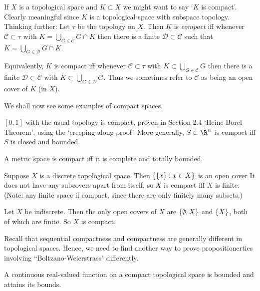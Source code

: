 \begin{remark}
    If $X$ is a topological space and $K\subset X$ we might want to say `$K$ is compact'. Clearly meaningful since $K$ is a topological space with subspace topology. Thinking further: Let $\tau$ be the topology on $X$. Then $K$ is \emph{compact} iff whenever $\mathcal{C}\subset \tau$ with $K = \bigcup_{G\in \mathcal{C}} G\cap K$ then there is a finite $\mathcal{D}\subset \mathcal{C}$ such that $K = \bigcup_{G\in \mathcal{D}} G\cap K$.

    Equivalently, $K$ is compact iff whenever $\mathcal{C}\subset \tau$ with $K\subset \bigcup_{G\in \mathcal{C}} G$ then there is a finite $\mathcal{D}\subset\mathcal{C}$ with $K\subset \bigcup_{G\in \mathcal{D}} G$. Thus we sometimes refer to $\mathcal{C}$ as being an open cover of $K$ (in $X$).
\end{remark} 

We shall now see some examples of compact spaces.
\begin{example}
    $[0,1]$ with the usual topology is compact, proven in Section 2.4 `Heine-Borel Theorem', using the `creeping along proof'. More generally, $S\subset \R^n$ is compact iff $S$ is closed and bounded.
\end{example} 

\begin{example}
    A metric space is compact iff it is complete and totally bounded.
\end{example} 

\begin{example}
    Suppose $X$ is a discrete topological space. Then $\{\{x\} : x\in X\}$ is an open cover It does not have any subcovers apart from itself, so $X$ is compact iff $X$ is finite. (Note: any finite space if compact, since there are only finitely many subsets.)
\end{example} 

\begin{example}
    Let $X$ be indiscrete. Then the only open covers of $X$ are $\{\emptyset, X\}$ and $\{X\}$, both of which are finite. So $X$ is compact.
\end{example} 

Recall that sequential compactness and compactness are generally different in topological spaces. Hence, we need to find another way to prove propositionerties involving ``Boltzano-Weierstrass" differently.
\begin{theorem} \label{thm:33}
A continuous real-valued function on a compact topological space is bounded and attains its bounds.
\end{theorem}   


